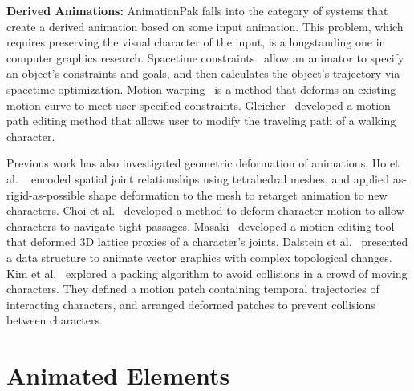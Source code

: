 \textbf{Derived Animations:} 
AnimationPak falls into the category of systems that create a derived
animation based on some input animation. This problem, which
requires preserving the visual character of the input, is a 
longstanding one in computer graphics research.
Spacetime constraints~\cite{Witkin1988, Cohen1992} allow an animator
to specify an object's constraints and goals, and then calculates 
the object's trajectory via spacetime optimization.
Motion warping~\cite{Witkin1995} is a method that deforms an existing
motion curve to meet user-specified constraints.
Gleicher~\cite{Gleicher2001} developed a motion path editing method
that allows user to modify the traveling path of a walking character.



Previous work has also investigated geometric deformation of 
animations.
Ho et al. ~\cite{Ho2010} encoded spatial joint relationships 
using tetrahedral meshes, and applied as-rigid-as-possible shape deformation
to the mesh to retarget animation to new characters.
Choi et al.~\cite{Choi2011} developed a method to deform character motion
to allow characters to navigate tight passages.
Masaki~\cite{Oshita2017} developed a motion editing tool that deformed
3D lattice proxies of  a character's joints.
Dalstein et al.~\cite{Dalstein2015} presented a data structure
to animate vector graphics with complex topological changes.
Kim et al.~\cite{Kim2012} explored a packing algorithm
to avoid collisions in a crowd of moving characters.
They defined a motion patch containing temporal trajectories of interacting
characters, and arranged deformed patches to prevent collisions between
characters.




\section{Animated Elements}
\label{animationpak_animated_element}




